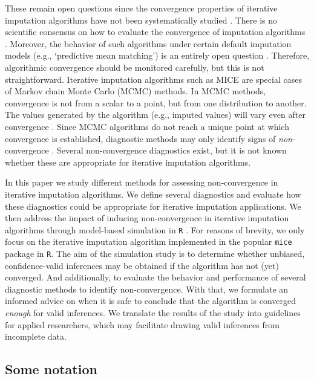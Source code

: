 \documentclass[Royal,times,sageh]{sagej}
\begin{document}
These remain open questions since the convergence properties of iterative imputation algorithms have not been systematically studied \citep{buur18}. There is no scientific consensus on how to evaluate the convergence of imputation algorithms \citep{zhu15, taka17}. Moreover, the behavior of such algorithms under certain default imputation models (e.g., `predictive mean matching') is an entirely open question \citep{murr18}. Therefore, algorithmic convergence should be monitored carefully, but this is not straightforward. Iterative imputation algorithms such as MICE are special cases of Markov chain Monte Carlo (MCMC) methods. In MCMC methods, convergence is not from a scalar to a point, but from one distribution to another. The values generated by the algorithm (e.g., imputed values) will vary even after convergence \citep{gelm13}. Since MCMC algorithms do not reach a unique point at which convergence is established, diagnostic methods may only identify signs of \emph{non}-convergence \citep{hoff09}. Several non-convergence diagnostics exist, but it is not known whether these are appropriate for iterative imputation algorithms.

In this paper we study different methods for assessing non-convergence in iterative imputation algorithms. We define several diagnostics and evaluate how these diagnostics could be appropriate for iterative imputation applications. We then address the impact of inducing non-convergence in iterative imputation algorithms through model-based simulation in \texttt{R} \citep{R}. For reasons of brevity, we only focus on the iterative imputation algorithm implemented in the popular \texttt{mice} package \citep{mice} in \texttt{R}. The aim of the simulation study is to determine whether unbiased, confidence-valid inferences may be obtained if the algorithm has not (yet) converged. And additionally, to evaluate the behavior and performance of several diagnostic methods to identify non-convergence. With that, we formulate an informed advice on when it is safe to conclude that the algorithm is converged \emph{enough} for valid inferences. We translate the results of the study into guidelines for applied researchers, which may facilitate drawing valid inferences from incomplete data.

\hypertarget{some-notation}{%
\subsection{Some notation}\label{some-notation}}
\end{document}
